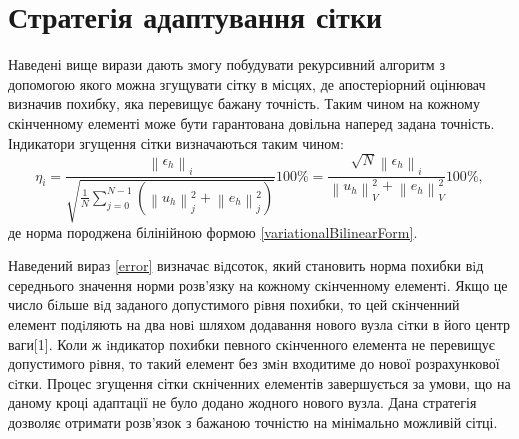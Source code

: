 \documentclass[a4paper]{article}
\newcommand\norm[1]{\left\lVert#1\right\rVert}
\numberwithin{equation}{section}
\begin{document}
\section{Стратегія адаптування сітки}
Наведені вище вирази дають змогу побудувати рекурсивний алгоритм з допомогою якого можна згущувати сітку в місцях, де апостеріорний оцінювач визначив похибку, яка перевищує бажану точність. Таким чином на кожному скінченному елементі може бути гарантована довільна наперед задана точність. Індикатори згущення сітки визначаються таким чином:
\begin{equation}\label{error}
\eta_i=\frac{\norm{\epsilon_h}_i}{\sqrt{ \frac{1}{N} \sum_{j=0}^{N-1}(\norm{u_h}_j^2 + \norm{e_h}_j^2)}}100\%=\frac{\sqrt{N}\norm{\epsilon_h}_i} {\norm{u_h}_V^2 + \norm{e_h}_V^2} 100\%,
\end{equation}
де норма породжена білінійною формою \ref{variationalBilinearForm}.

Наведений вираз \ref{error} визначає вiдсоток, який становить норма похибки вiд середнього значення норми розв’язку на кожному скiнченному елементi. Якщо це число бiльше вiд заданого допустимого рiвня похибки, то цей скiнченний елемент подiляють на два новi шляхом додавання нового вузла сiтки в його центр ваги[1]. Коли ж iндикатор похибки певного скiнченного елемента не перевищує допустимого рiвня, то такий елемент без змiн входитиме до нової розрахункової сiтки. Процес згущення сітки скніченних елементів завершується за умови, що на даному кроці адаптації не було додано жодного нового вузла.
Дана стратегія дозволяє отримати розв'язок з бажаною точністю на мінімально можливій сітці.
\end{document}
